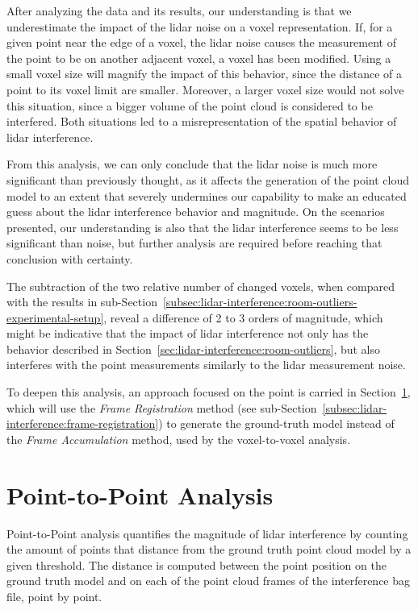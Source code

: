 After analyzing the data and its results, our understanding is that we underestimate the impact of the \ac{lidar} noise on a voxel representation. If, for a given point near the edge of a voxel, the \ac{lidar} noise causes the measurement of the point to be on another adjacent voxel, a voxel has been modified. Using a small voxel size will magnify the impact of this behavior, since the distance of a point to its voxel limit are smaller. Moreover, a larger voxel size would not solve this situation, since a bigger volume of the point cloud is considered to be interfered. Both situations led to a misrepresentation of the spatial behavior of \ac{lidar} interference. 

From this analysis, we can only conclude that the \ac{lidar} noise is much more significant than previously thought, as it affects the generation of the point cloud model to an extent that severely undermines our capability to make an educated guess about the \ac{lidar} interference behavior and magnitude. On the scenarios presented, our understanding is also that the \ac{lidar} interference seems to be less significant than noise, but further analysis are required before reaching that conclusion with certainty.

The subtraction of the two relative number of changed voxels, when compared with the results in sub-Section~\ref{subsec:lidar-interference:room-outliers-experimental-setup}, reveal a difference of 2 to 3 orders of magnitude, which might be indicative that the impact of \ac{lidar} interference not only has the behavior described in Section~\ref{sec:lidar-interference:room-outliers}, but also interferes with the point measurements similarly to the \ac{lidar} measurement noise.

To deepen this analysis, an approach focused on the point is carried in Section~\ref{sec:lidar-interference:point-to-point-analysis}, which will use the \textit{Frame Registration} method (see sub-Section~\ref{subsec:lidar-interference:frame-registration}) to generate the ground-truth model instead of the \textit{Frame Accumulation} method, used by the voxel-to-voxel analysis.



\section{Point-to-Point Analysis}
\label{sec:lidar-interference:point-to-point-analysis}
Point-to-Point analysis quantifies the magnitude of \ac{lidar} interference by counting the amount of points that distance from the ground truth point cloud model by a given threshold. The distance is computed between the point position on the ground truth model and on each of the point cloud frames of the interference bag file, point by point.

